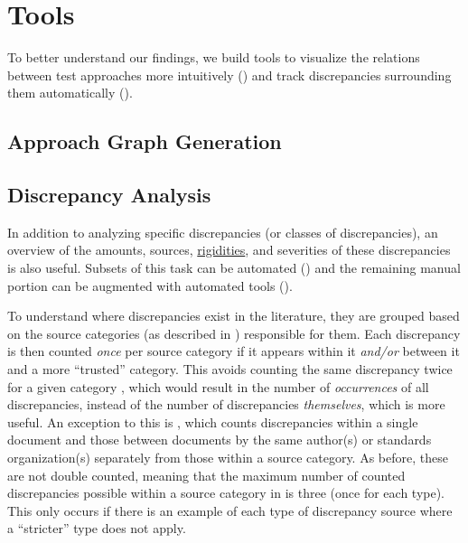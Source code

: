 \section{Tools}
\label{tools}

To better understand our findings, we build tools to visualize the
relations between test approaches more intuitively () and track
discrepancies surrounding them automatically ().

\subsection{Approach Graph Generation}
\label{graph-gen}

\graphGenDesc{}

\subsection{Discrepancy Analysis}
\label{discrep-analysis}

In addition to analyzing specific discrepancies (or classes of discrepancies),
an overview of the amounts, sources, \hyperref[rigidity]{rigidities}, and
severities of these discrepancies is also
useful. Subsets of this task can be automated ()
and the remaining manual portion can be augmented with automated
tools ().

To understand where discrepancies exist in the literature, they are
grouped based on the source categories (as described in )
responsible for them. Each discrepancy is then counted \emph{once} per source
category if it appears within it \emph{and/or} between it and a more
``trusted'' category.
This avoids counting the same discrepancy twice for a given category%
, which would result in the number of
\emph{occurrences} of all discrepancies, instead of the number of discrepancies
\emph{themselves}, which is more useful. An exception to this is
, which counts discrepancies within a single document
and those between documents by the same author(s) or standards organization(s)
separately from those within a source category. As before, these are not double
counted, meaning that the maximum number of counted discrepancies possible
within a source category in  is three (once for each
type). This only occurs if there is an example of each type of discrepancy
source where a ``stricter'' type does not apply.

